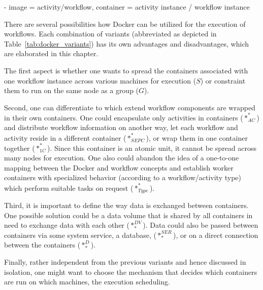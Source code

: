 - image = activity/workflow, container = activity instance / workflow instance

There are several possibilities how Docker can be utilized for the execution of workflows.
Each combination of variants (abbreviated as depicted in Table~\ref{tab:docker_variants}) has its own advantages and disadvantages, which are elaborated in this chapter.

The first aspect is whether one wants to spread the containers associated with one workflow instance across various machines for execution ($S$) or constraint them to run on the same node as a group ($G$).

Second, one can differentiate to which extend workflow components are wrapped in their own containers.
One could encapsulate only activities in containers ($*_{AC}^{*}$) and distribute workflow information on another way, let each workflow and activity reside in a different container ($*_{SEPC}^{*}$), or wrap them in one container together ($*_{1C}^{*}$). Since this container is an atomic unit, it cannot be spread across many nodes for execution. One also could abandon the idea of a one-to-one mapping between the Docker and workflow concepts and establish worker containers with specialized behavior (according to a workflow/activity type) which perform suitable tasks on request ($*_{Type}^{*}$).

Third, it is important to define the way data is exchanged between containers. One possible solution could be a data volume that is shared by all containers in need to exchange data with each other ($*_{*}^{DV}$). Data could also be passed between containers via some system service, \eg a database, ($*_{*}^{SER}$), or on a direct connection between the containers ($*_{*}^{D}$).

Finally, rather independent from the previous variants and hence discussed in isolation, one might want to choose the mechanism that decides which containers are run on which machines, \ie the execution scheduling.

